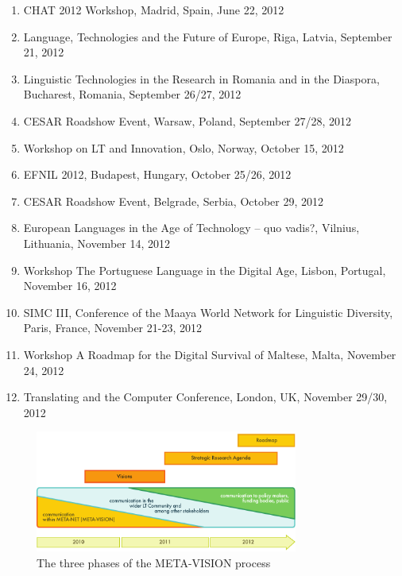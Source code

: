 \documentclass[10pt, plain]{../../metanetpaper}
\begin{document}
\begin{footnotesize}
\begin{enumerate}
\item CHAT 2012 Workshop, Madrid, Spain, June 22, 2012
\item Language, Technologies and the Future of Europe, Riga, Latvia, September 21, 2012
\item Linguistic Technologies in the Research in Romania and in the Diaspora, Bucharest, Romania, September 26/27, 2012
\item CESAR Roadshow Event, Warsaw, Poland, September 27/28, 2012
\item Workshop on LT and Innovation, Oslo, Norway, October 15, 2012
\item EFNIL 2012, Budapest, Hungary, October 25/26, 2012
\item CESAR Roadshow Event, Belgrade, Serbia, October 29, 2012
\item European Languages in the Age of Technology -- quo vadis?, Vilnius, Lithuania, November 14, 2012
\item Workshop The Portuguese Language in the Digital Age, Lisbon, Portugal, November 16, 2012
\item SIMC III, Conference of the Maaya World Network for Linguistic Diversity, Paris, France, November 21-23, 2012
\item Workshop A Roadmap for the Digital Survival of Maltese, Malta, November 24, 2012
\item Translating and the Computer Conference, London, UK, November 29/30, 2012
\end{enumerate}
\end{footnotesize}

\begin{figure}[htb]
  \center
  \includegraphics[width=0.77\textwidth]{../_media/Timeline}
  \caption{The three phases of the META-VISION process}
  \label{fig:sra-timeline}
\end{figure}
 
\end{document}
